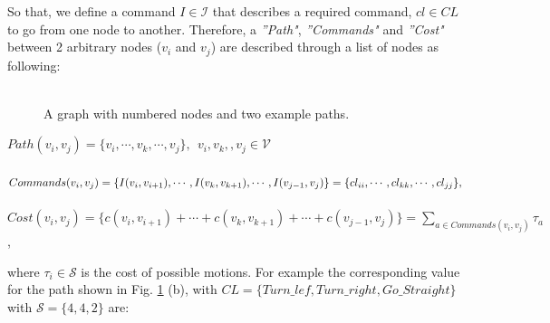 \documentclass[twocolumn]{svjour3}       %
\begin{document}
So that, we define a command $I \in \mathcal {I}$ that describes a required command, $cl \in CL$ to go from one node to another. Therefore, a \textit{''Path"}, \textit{''Commands"} and \textit{''Cost"} between 2 arbitrary nodes ($v_i$ and $v_j$) are described through a list of nodes as following:\\
\\
\begin{figure}[h]
	\centering
	\caption{A graph with numbered nodes and two example paths.}
	\label{fig:numberedGraph}
\end{figure}
%
%
$Path(v_i,v_j)=\{v_i,\cdots,v_k,\cdots,v_j\}, ~~v_i,v_k,,v_j \in \mathcal V$\\
\\
\sloppy $Commands(v_i,v_j)= \{I(v_i,v_{i+1}),\cdots,I(v_k,v_{k+1}),\cdots,I(v_{j-1},v_j)\}\\
=\{cl_{ii},\cdots,cl_{kk},\cdots,cl_{jj}\},$\\
\\
$Cost(v_i,v_j)=\{c(v_i,v_{i+1})+\cdots+c(v_k,v_{k+1})+\cdots+c(v_{j-1},v_j)\}=\sum\limits_{a \in Commands(v_i,v_j)}\tau_a$, 

where $\tau_i \in \mathcal{S}$ is the cost of possible motions.
%
For example the corresponding value for the path shown in Fig. \ref{fig:numberedGraph} (b), with \sloppy $CL=\{Turn\_lef, Turn\_right, Go\_Straight\}$ with $\mathcal S=\{4,4,2\}$ are:
\end{document}
